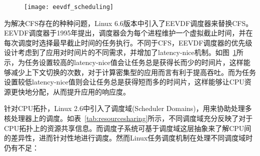 \begin{figure}[!htbp]
    \centering
    \texttt{[image: eevdf\_scheduling]}
    \label{fig:eevdf_scheduling}
\end{figure}

为解决CFS存在的种种问题，Linux 6.6版本中引入了EEVDF调度器来替换CFS。EEVDF调度器\citep{stoica1995earliest}于1995年提出，调度器会为每个进程维护一个虚拟截止时间，并在每次调度时选择最早截止时间的任务执行。不同于CFS，EEVDF调度器的优先级设计考虑到了应用对时间片的不同需求，并增加了latency-nice机制。如图~\ref{fig:eevdf_scheduling}所示，为任务设置较高的latency-nice值会让任务总是获得长而少的时间片，这样能够减少上下文切换的次数，对于计算密集型的应用而言有利于提高吞吐。而为任务设置较低latency-nice值则会让任务总是获得短而多的时间片，这样能够让CPU资源更快地分配，从而提升应用的响应度。

针对CPU拓扑，Linux 2.6中引入了调度域(Scheduler Domains)\citep{schedulerdomains}，用来协助处理多核处理器上的调度。如表~\ref{tab:resourcesharing}所示，不同调度域充分反映了对于CPU拓扑上的资源共享信息。而调度子系统可基于调度域这层抽象来了解CPU间的差异性，进而针对性地进行调度。然而Linux任务调度机制在处理不同调度域时仍有不足：

